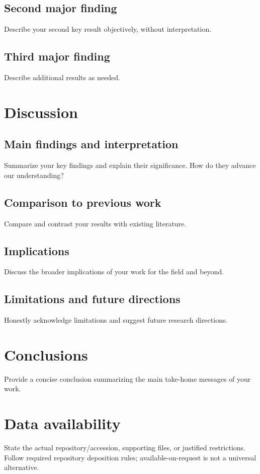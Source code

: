 \documentclass[12pt]{article}
\begin{document}
\subsection*{Second major finding}
Describe your second key result objectively, without interpretation.

\subsection*{Third major finding}
Describe additional results as needed.

\section*{Discussion}

\subsection*{Main findings and interpretation}
Summarize your key findings and explain their significance. How do they advance our understanding?

\subsection*{Comparison to previous work}
Compare and contrast your results with existing literature\cite{example2023}.

\subsection*{Implications}
Discuss the broader implications of your work for the field and beyond.

\subsection*{Limitations and future directions}
Honestly acknowledge limitations and suggest future research directions.

\section*{Conclusions}
Provide a concise conclusion summarizing the main take-home messages of your work.

\section*{Data availability}
State the actual repository/accession, supporting files, or justified restrictions. Follow required repository deposition rules; available-on-request is not a universal alternative.
\end{document}

